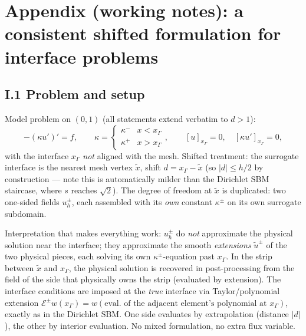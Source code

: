 
\section*{Appendix (working notes): a consistent shifted formulation for interface problems}

\subsection*{I.1 Problem and setup}

Model problem on $(0,1)$ (all statements extend verbatim to $d>1$):
\[
  -(\kappa u')' = f, \qquad
  \kappa = \begin{cases} \kappa^- & x < x_\Gamma \\ \kappa^+ & x > x_\Gamma \end{cases},
  \qquad
  [u]_{x_\Gamma} = 0, \quad [\kappa u']_{x_\Gamma} = 0,
\]
with the interface $x_\Gamma$ \emph{not} aligned with the mesh. Shifted
treatment: the surrogate interface is the nearest mesh vertex $\tilde x$,
shift $d = x_\Gamma - \tilde x$ (so $|d| \le h/2$ by construction --- note
this is automatically milder than the Dirichlet SBM staircase, where $s$
reaches $\sqrt 2$). The degree of freedom at $\tilde x$ is duplicated: two
one-sided fields $u_h^\pm$, each assembled with its \emph{own} constant
$\kappa^\pm$ on its own surrogate subdomain.

Interpretation that makes everything work: $u_h^\pm$ do \emph{not}
approximate the physical solution near the interface; they approximate the
smooth \emph{extensions} $\tilde u^\pm$ of the two physical pieces, each
solving its own $\kappa^\pm$-equation past $x_\Gamma$. In the strip between
$\tilde x$ and $x_\Gamma$, the physical solution is recovered in
post-processing from the field of the side that physically owns the strip
(evaluated by extension). The interface conditions are imposed at the
\emph{true} interface via Taylor/polynomial extension
$\mathcal E^\pm w (x_\Gamma) = w(\text{eval.\ of the adjacent element's
polynomial at } x_\Gamma)$, exactly as in the Dirichlet SBM. One side
evaluates by extrapolation (distance $|d|$), the other by interior
evaluation. No mixed formulation, no extra flux variable.

